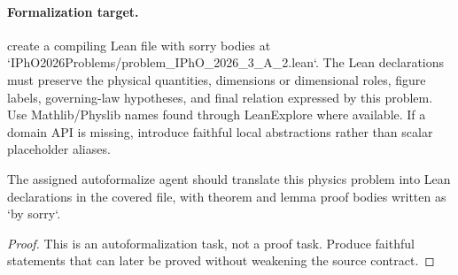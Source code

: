 \paragraph{Formalization target.}
create a compiling Lean file with sorry bodies at `IPhO2026Problems/problem\_IPhO\_2026\_3\_A\_2.lean`.
The Lean declarations must preserve the physical quantities, dimensions or dimensional roles, figure labels, governing-law hypotheses, and final relation expressed by this problem.
Use Mathlib/Physlib names found through LeanExplore where available. If a domain API is missing, introduce faithful local abstractions rather than scalar placeholder aliases.

\begin{theorem}
\label{thm:physics:IPhO_2026_3_A_2:target}
The assigned autoformalize agent should translate this physics problem into Lean declarations in the covered file, with theorem and lemma proof bodies written as `by sorry`.
\end{theorem}
\begin{proof}
This is an autoformalization task, not a proof task. Produce faithful statements that can later be proved without weakening the source contract.
\end{proof}


